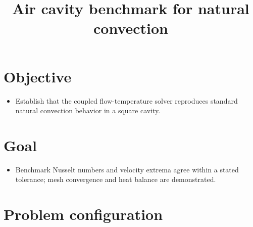 \documentclass[preprint,3p,number]{elsarticle}
\begin{document}
\title{Air cavity benchmark for natural convection}
\maketitle

\section{Objective}

\begin{itemize}
    \item Establish that the coupled flow-temperature solver reproduces standard
    natural convection behavior in a square cavity.
\end{itemize}

\section{Goal}

\begin{itemize}
    \item Benchmark Nusselt numbers and velocity extrema agree within a stated
    tolerance; mesh convergence and heat balance are demonstrated.
\end{itemize}

\section{Problem configuration}
\end{document}
